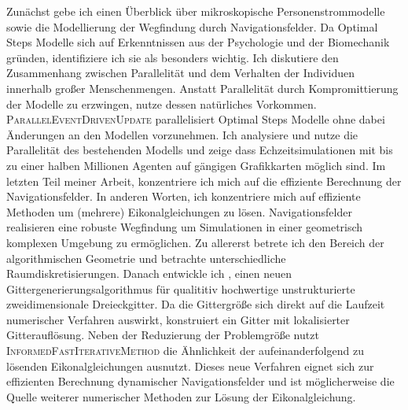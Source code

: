 {Zunächst gebe ich einen Überblick über mikroskopische Personenstrommodelle sowie die Modellierung der Wegfindung durch Navigationsfelder.
Da Optimal Steps Modelle sich auf Erkenntnissen aus der Psychologie und der Biomechanik gründen, identifiziere ich sie als besonders wichtig.
Ich diskutiere den Zusammenhang zwischen Parallelität und dem Verhalten der Individuen innerhalb großer Menschenmengen.
Anstatt Parallelität durch Kompromittierung der Modelle zu erzwingen, nutze dessen natürliches Vorkommen.
\textsc{ParallelEventDrivenUpdate} parallelisiert Optimal Steps Modelle ohne dabei Änderungen an den Modellen vorzunehmen.
Ich analysiere und nutze die Parallelität des bestehenden Modells und zeige dass Echzeitsimulationen mit bis zu einer halben Millionen Agenten auf gängigen Grafikkarten möglich sind.
Im letzten Teil meiner Arbeit, konzentriere ich mich auf die effiziente Berechnung der Navigationsfelder.
In anderen Worten, ich konzentriere mich auf effiziente Methoden um (mehrere) Eikonalgleichungen zu lösen.
Navigationsfelder realisieren eine robuste Wegfindung um Simulationen in einer geometrisch komplexen Umgebung zu ermöglichen.
Zu allererst betrete ich den Bereich der algorithmischen Geometrie und betrachte unterschiedliche Raumdiskretisierungen.
Danach entwickle ich \eikmesh{}, einen neuen Gittergenerierungsalgorithmus für qualititiv hochwertige unstrukturierte zweidimensionale Dreieckgitter.
Da die Gittergröße sich direkt auf die Laufzeit numerischer Verfahren auswirkt, konstruiert \eikmesh{} ein Gitter mit lokalisierter Gitterauflösung.
Neben der Reduzierung der Problemgröße nutzt \textsc{InformedFastIterativeMethod} die Ähnlichkeit der aufeinanderfolgend zu lösenden Eikonalgleichungen ausnutzt. Dieses neue Verfahren eignet sich zur effizienten Berechnung dynamischer Navigationsfelder und ist möglicherweise die Quelle weiterer numerischer Methoden zur Lösung der Eikonalgleichung.
}
